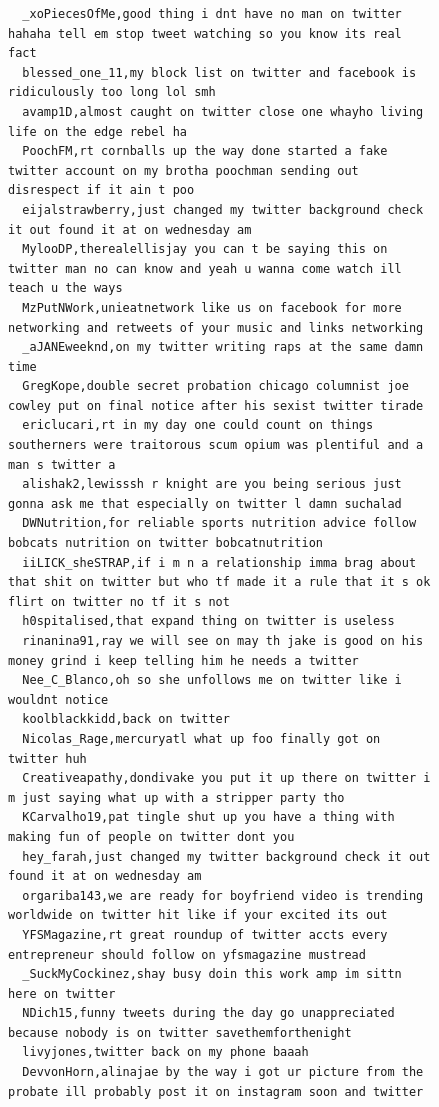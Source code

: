 \begin{figure}[htpb]
\begin{verbatim}
  _xoPiecesOfMe,good thing i dnt have no man on twitter hahaha tell em stop tweet watching so you know its real fact
  blessed_one_11,my block list on twitter and facebook is ridiculously too long lol smh
  avamp1D,almost caught on twitter close one whayho living life on the edge rebel ha
  PoochFM,rt cornballs up the way done started a fake twitter account on my brotha poochman sending out disrespect if it ain t poo
  eijalstrawberry,just changed my twitter background check it out found it at on wednesday am
  MylooDP,therealellisjay you can t be saying this on twitter man no can know and yeah u wanna come watch ill teach u the ways
  MzPutNWork,unieatnetwork like us on facebook for more networking and retweets of your music and links networking
  _aJANEweeknd,on my twitter writing raps at the same damn time
  GregKope,double secret probation chicago columnist joe cowley put on final notice after his sexist twitter tirade
  ericlucari,rt in my day one could count on things southerners were traitorous scum opium was plentiful and a man s twitter a
  alishak2,lewisssh r knight are you being serious just gonna ask me that especially on twitter l damn suchalad
  DWNutrition,for reliable sports nutrition advice follow bobcats nutrition on twitter bobcatnutrition
  iiLICK_sheSTRAP,if i m n a relationship imma brag about that shit on twitter but who tf made it a rule that it s ok flirt on twitter no tf it s not
  h0spitalised,that expand thing on twitter is useless
  rinanina91,ray we will see on may th jake is good on his money grind i keep telling him he needs a twitter
  Nee_C_Blanco,oh so she unfollows me on twitter like i wouldnt notice
  koolblackkidd,back on twitter
  Nicolas_Rage,mercuryatl what up foo finally got on twitter huh
  Creativeapathy,dondivake you put it up there on twitter i m just saying what up with a stripper party tho
  KCarvalho19,pat tingle shut up you have a thing with making fun of people on twitter dont you
  hey_farah,just changed my twitter background check it out found it at on wednesday am
  orgariba143,we are ready for boyfriend video is trending worldwide on twitter hit like if your excited its out
  YFSMagazine,rt great roundup of twitter accts every entrepreneur should follow on yfsmagazine mustread
  _SuckMyCockinez,shay busy doin this work amp im sittn here on twitter
  NDich15,funny tweets during the day go unappreciated because nobody is on twitter savethemforthenight
  livyjones,twitter back on my phone baaah
  DevvonHorn,alinajae by the way i got ur picture from the probate ill probably post it on instagram soon and twitter

\end{verbatim}
\end{figure}
